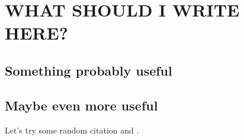 
\section{WHAT SHOULD I WRITE HERE?}

\subsection{Something probably useful}

\lipsum[8-12]

\subsection{Maybe even more useful}

\lipsum[12-16]

Let's try some random citation \cite{test1, test2} and \cite{test3}.

\newpage


